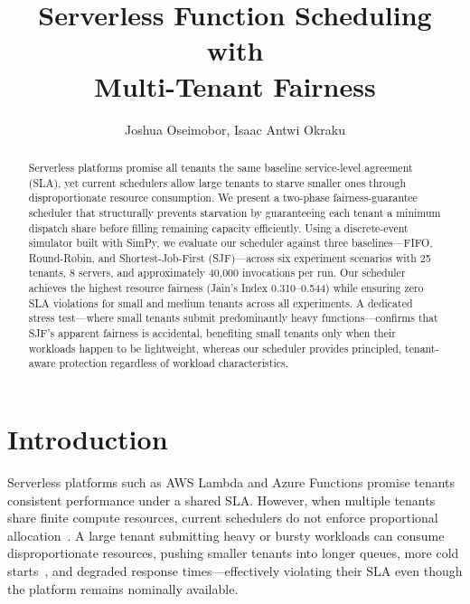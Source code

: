 \documentclass[runningheads]{llncs}
\begin{document}
\title{Serverless Function Scheduling with \\ Multi-Tenant Fairness}

\author{ Joshua Oseimobor, Isaac Antwi Okraku}


\maketitle

\begin{abstract}
Serverless platforms promise all tenants the same baseline service-level agreement (SLA), yet current schedulers allow large tenants to starve smaller ones through disproportionate resource consumption. We present a two-phase fairness-guarantee scheduler that structurally prevents starvation by guaranteeing each tenant a minimum dispatch share before filling remaining capacity efficiently. Using a discrete-event simulator built with SimPy, we evaluate our scheduler against three baselines---FIFO, Round-Robin, and Shortest-Job-First (SJF)---across six experiment scenarios with 25 tenants, 8 servers, and approximately 40,000 invocations per run. Our scheduler achieves the highest resource fairness (Jain's Index 0.310--0.544) while ensuring zero SLA violations for small and medium tenants across all experiments. A dedicated stress test---where small tenants submit predominantly heavy functions---confirms that SJF's apparent fairness is accidental, benefiting small tenants only when their workloads happen to be lightweight, whereas our scheduler provides principled, tenant-aware protection regardless of workload characteristics.

\end{abstract}

\section{Introduction}\label{sec:intro}

Serverless platforms such as AWS Lambda and Azure Functions promise tenants consistent performance under a shared SLA. However, when multiple tenants share finite compute resources, current schedulers do not enforce proportional allocation~\cite{shahrad2020serverless}. A large tenant submitting heavy or bursty workloads can consume disproportionate resources, pushing smaller tenants into longer queues, more cold starts~\cite{wang2018peeking}, and degraded response times---effectively violating their SLA even though the platform remains nominally available.
\end{document}
